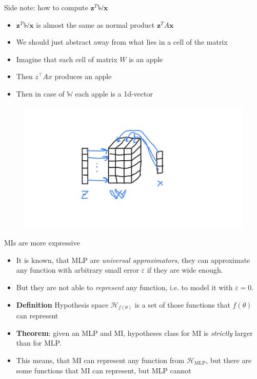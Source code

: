 \documentclass[10pt]{beamer}
\begin{document}
\begin{frame}{Side note: how to compute $\mathbf{z}^{T} \mathbb{W} \mathbf{x}$}
    \begin{itemize}
        \item\pause $\mathbf{z}^{T} \mathbb{W} \mathbf{x}$ is almost the same as normal product $\mathbf{z}^{T} A \mathbf{x}$
        \item\pause We should just abstract away from what lies in a cell of the matrix
        \item\pause Imagine that each cell of matrix $W$ is an apple
        \item\pause Then $z^\top A x$ produces an apple
        \item\pause Then in case of $\mathbb{W}$ each apple is a 1d-vector
    \end{itemize}
    \begin{figure}
        \centering
        \includegraphics[width=\textwidth]{images/3d-matrix-dot-product}
    \end{figure}
\end{frame}

\begin{frame}{MIs are more expressive}
    \begin{itemize}
        \item\pause It is known, that MLP are \textit{universal approximators}, they can approximate any function with arbitrary small error $\varepsilon$ if they are wide enough.
        \item\pause But they are not able to \textit{represent} any function, i.e. to model it with $\varepsilon = 0$.
        \item\pause \textbf{Definition} Hypothesis space $\mathcal{H}_{f(\theta)}$ is a set of those functions that $f(\theta)$ can represent
        \item\pause \textbf{Theorem}: given an MLP and MI, hypotheses class for MI is \textit{strictly} larger than for MLP.
        \item\pause This means, that MI can represent any function from $\mathcal{H}_\text{MLP}$, but there are some functions that MI can represent, but MLP cannot
    \end{itemize}
\end{frame}
\end{document}
